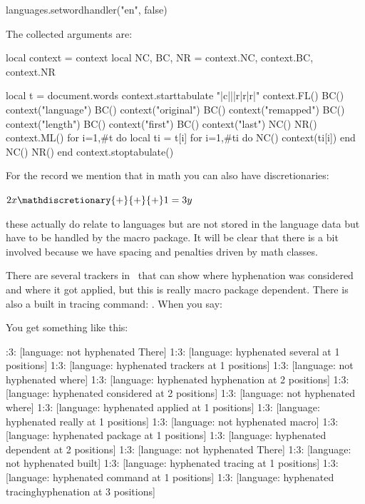 \box\scratchbox

\startluacode
languages.setwordhandler("en", false)
\stopluacode
\stopbuffer

\typebuffer[option=TEX]

\startlinecorrection
    \getbuffer
\stoplinecorrection

\testpage[3]

The collected arguments are:

\startluacode
local context = context
local NC, BC, NR = context.NC, context.BC, context.NR

local t = document.words
context.starttabulate { "|c|||r|r|r|" }
    context.FL()
    BC() context("language")
    BC() context("original")
    BC() context("remapped")
    BC() context("length")
    BC() context("first")
    BC() context("last")
    NC() NR()
    context.ML()
    for i=1,#t do
        local ti = t[i]
        for i=1,#ti do
            NC()
            context(ti[i])
        end
        NC() NR()
    end
context.stoptabulate()
\stopluacode

\stopsection

\startsection[title=Math]

For the record we mention that in math you can also have discretionaries:

\starttyping
$ 2x \mathdiscretionary{+}{+}{+} 1 = 3y $
\stoptyping

these actually do relate to languages but are not stored in the language data but
have to be handled by the macro package. It will be clear that there is a bit
involved because we have spacing and penalties driven by math classes.

\stopsection

\startsection[title=Tracing]

There are several trackers in \CONTEXT\ that can show where hyphenation was considered and
where it got applied, but this is really macro package dependent. There is also a built in
tracing command: \typ {\tracinghyphenation}. When you say:

\starttyping
{}
\stoptyping

You get something like this:

:3: [language: not hyphenated There]
1:3: [language: hyphenated several at 1 positions]
1:3: [language: hyphenated trackers at 1 positions]
1:3: [language: not hyphenated where]
1:3: [language: hyphenated hyphenation at 2 positions]
1:3: [language: hyphenated considered at 2 positions]
1:3: [language: not hyphenated where]
1:3: [language: hyphenated applied at 1 positions]
1:3: [language: hyphenated really at 1 positions]
1:3: [language: not hyphenated macro]
1:3: [language: hyphenated package at 1 positions]
1:3: [language: hyphenated dependent at 2 positions]
1:3: [language: not hyphenated There]
1:3: [language: not hyphenated built]
1:3: [language: hyphenated tracing at 1 positions]
1:3: [language: hyphenated command at 1 positions]
1:3: [language: hyphenated tracinghyphenation at 3 positions]
\stoptyping

